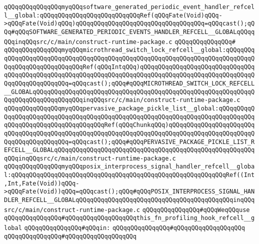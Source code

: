 \verb|qQQqqQQqqQQqqQQqmyqQQqsoftware_generated_periodic_event_handler_refcell__global:qQQqqQQqqQQqqQQqqQQqqQQqqQQqRef(qQQqFate(Void)qQQq->qQQqFate(Void)qQQq)qQQqqQQqqQQqqQQqqQQqqQQqqQQqqQQqqQQq=qQQqcast();qQQq#qQQqSOFTWARE_GENERATED_PERIODIC_EVENTS_HANDLER_REFCELL__GLOBALqQQqqQQqinqQQqsrc/c/main/construct-runtime-package.c|\newline
\verb|qQQqqQQqqQQqqQQq#|\newline
\verb|qQQqqQQqqQQqqQQqmyqQQqmicrothread_switch_lock_refcell__global:qQQqqQQqqQQqqQQqqQQqqQQqqQQqqQQqqQQqqQQqqQQqqQQqqQQqqQQqqQQqqQQqqQQqqQQqqQQqqQQqqQQqqQQqqQQqqQQqqQQqRef(qQQqIntqQQq)qQQqqQQqqQQqqQQqqQQqqQQqqQQqqQQqqQQqqQQqqQQqqQQqqQQqqQQqqQQqqQQqqQQqqQQqqQQqqQQqqQQqqQQqqQQqqQQqqQQqqQQqqQQqqQQqqQQqqQQq=qQQqcast();qQQq#qQQqMICROTHREAD_SWITCH_LOCK_REFCELL__GLOBALqQQqqQQqqQQqqQQqqQQqqQQqqQQqqQQqqQQqqQQqqQQqqQQqqQQqqQQqqQQqqQQqqQQqqQQqqQQqqQQqqQQqinqQQqsrc/c/main/construct-runtime-package.c|\newline
\verb|qQQqqQQqqQQqqQQqmyqQQqpervasive_package_pickle_list__global:qQQqqQQqqQQqqQQqqQQqqQQqqQQqqQQqqQQqqQQqqQQqqQQqqQQqqQQqqQQqqQQqqQQqqQQqqQQqqQQqqQQqqQQqqQQqqQQqqQQqqQQqqQQqRef(qQQqChunkqQQq)qQQqqQQqqQQqqQQqqQQqqQQqqQQqqQQqqQQqqQQqqQQqqQQqqQQqqQQqqQQqqQQqqQQqqQQqqQQqqQQqqQQqqQQqqQQqqQQqqQQqqQQqqQQqqQQq=qQQqcast();qQQq#qQQqPERVASIVE_PACKAGE_PICKLE_LIST_REFCELL__GLOBALqQQqqQQqqQQqqQQqqQQqqQQqqQQqqQQqqQQqqQQqqQQqqQQqqQQqqQQqqQQqinqQQqsrc/c/main/construct-runtime-package.c|\newline
\verb|qQQqqQQqqQQqqQQqmyqQQqposix_interprocess_signal_handler_refcell__global:qQQqqQQqqQQqqQQqqQQqqQQqqQQqqQQqqQQqqQQqqQQqqQQqqQQqqQQqqQQqRef((Int,Int,Fate(Void))qQQq->qQQqFate(Void))qQQq=qQQqcast();qQQq#qQQqPOSIX_INTERPROCESS_SIGNAL_HANDLER_REFCELL__GLOBALqQQqqQQqqQQqqQQqqQQqqQQqqQQqqQQqqQQqqQQqqQQqinqQQqsrc/c/main/construct-runtime-package.c|\newline
\newline
\newline
\verb|qQQqqQQqqQQqqQQq#qQQqWeqQQquse|\newline
\verb|qQQqqQQqqQQqqQQq#qQQqqQQqqQQqqQQqqQQqthis_fn_profiling_hook_refcell__global|\newline
\verb|qQQqqQQqqQQqqQQq#qQQqin:|\newline
\verb|qQQqqQQqqQQqqQQq#qQQqqQQqqQQqqQQqqQQq|\newline
\verb|qQQqqQQqqQQqqQQq#qQQqqQQqqQQqqQQqqQQq|\newline
